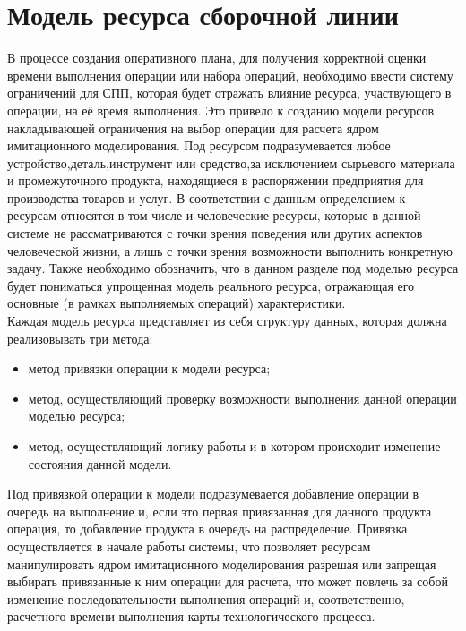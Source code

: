 \section{Модель ресурса сборочной линии}
\indent В процессе создания оперативного плана, для получения корректной оценки времени выполнения операции или набора операций, необходимо ввести систему ограничений для СПП, которая будет отражать влияние ресурса, участвующего в операции, на её время выполнения.
Это привело к созданию модели ресурсов накладывающей ограничения на выбор операции для расчета ядром имитационного моделирования.
Под ресурсом подразумевается любое устройство,деталь,инструмент или средство,за исключением сырьевого материала и промежуточного продукта, находящиеся в распоряжении предприятия для производства товаров и услуг.
В соответствии с данным определением к ресурсам относятся в том числе и человеческие ресурсы, которые в данной системе не рассматриваются с точки зрения поведения или других аспектов человеческой жизни, а лишь с точки зрения возможности выполнить конкретную задачу.
Также необходимо обозначить, что в данном разделе под моделью ресурса будет пониматься упрощенная модель реального ресурса, отражающая его основные (в рамках выполняемых операций) характеристики.\\
\indent Каждая модель ресурса представляет из себя структуру данных, которая должна реализовывать три метода:
\begin{itemize}
	\item метод привязки операции к модели ресурса;
	\item метод, осуществляющий проверку возможности выполнения данной операции моделью ресурса;
	\item метод, осуществляющий логику работы и в котором происходит изменение состояния данной модели.
\end{itemize}

\indent Под привязкой операции к модели подразумевается добавление операции в очередь на выполнение и, если это первая привязанная для данного продукта операция, то добавление продукта в очередь на распределение. Привязка осуществляется в начале работы системы, что позволяет ресурсам манипулировать ядром имитационного моделирования разрешая или запрещая выбирать привязанные к ним операции для расчета, что может повлечь за собой изменение последовательности выполнения операций и, соответственно, расчетного времени выполнения карты технологического процесса.

